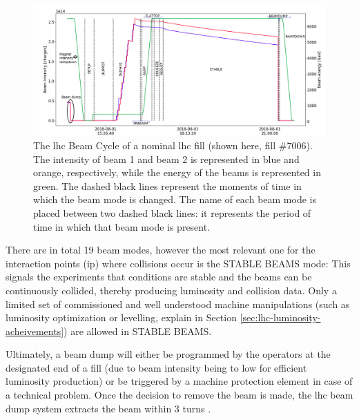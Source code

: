 \documentclass[encoding=utf8,british]{tumphthesis}
\begin{document}
\begin{figure}[H]
    \centering
    \includegraphics[width=1.0\linewidth]{figures/LHC-cycle-Sara.png}
    \caption{The \acrshort{lhc} Beam Cycle of a nominal \acrshort{lhc} fill (shown here, fill \#7006). The intensity of beam 1 and beam 2 is represented in blue and orange, respectively, while the energy of the beams is represented in green. The dashed black lines represent the moments of time in which the beam mode is changed. The name of each beam mode is placed between two dashed black lines: it represents the period of time in which that beam mode is present. \cite{thesis-Sara-Morales}}
    \label{fig:lhc-life-cycle}
\end{figure}

There are in total 19 beam modes, however the most relevant one for the interaction points (\acrshort{ip}) where collisions occur is the STABLE BEAMS mode: This signals the experiments that conditions are stable and the beams can be continuously collided, thereby producing luminosity and collision data. Only a limited set of commissioned and well understood machine manipulations (such as luminosity optimization or levelling, explain in Section \ref{sec:lhc-luminosity-acheivements}) are allowed in STABLE BEAMS. 


Ultimately, a beam dump will either be programmed by the operators at the designated end of a fill (due to beam intensity being to low for efficient luminosity production) or be triggered by a machine protection element in case of a technical problem. Once the decision to remove the beam is made, the \acrshort{lhc} beam dump system extracts the beam within 3 turns \cite{LHC-design-report}.
\end{document}
